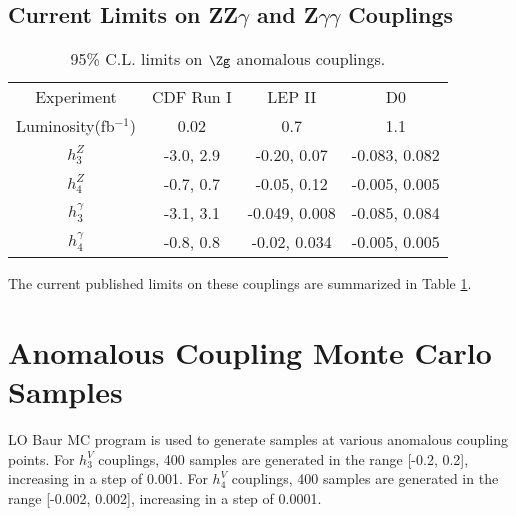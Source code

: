 \documentclass[12pt,twoside,letterpaper]{article}
\begin{document}
\subsection{Current Limits on ZZ$\gamma$ and Z$\gamma\gamma$ Couplings}
    \begin{table}[!hbtp]
    \begin{center}
    \begin{tabular}{|c|c|c|c|}
 \hline
           Experiment        &CDF Run I\cite{CDFRunIZg} &LEP II\cite{EWMsrmnt}& D0 \cite{D0Zg}     \\
      Luminosity(fb$^{-1}$)  &  0.02                    &  0.7                &   1.1                       \\
 \hline                                                                      
           $h_3^Z$           &    -3.0, 2.9             &  -0.20, 0.07        &    -0.083, 0.082                \\
           $h_4^Z$           &    -0.7, 0.7             &  -0.05, 0.12        &    -0.005, 0.005                \\
 \hline                                                                      
           $h_3^{\gamma}$    &    -3.1, 3.1             &  -0.049, 0.008      &    -0.085, 0.084                \\
           $h_4^{\gamma}$    &    -0.8, 0.8             &  -0.02, 0.034       &    -0.005, 0.005                \\
 \hline
    \end{tabular}
     \caption{95\% C.L. limits on $\Zg$ anomalous couplings. }
     \label{Table:ZgAGC}
    \end{center}
    \end{table}


The current published limits on these couplings are summarized in Table
\ref{Table:ZgAGC}. 

\section{Anomalous Coupling Monte Carlo Samples}
LO Baur MC program \cite{BaurPRD47} is used to generate \Zg samples at various
anomalous coupling points. 
For $h_3^V$ couplings, 400 samples are
generated in the range [-0.2, 0.2], increasing in a step of 0.001. 
For $h_4^V$ couplings, 400 samples are
generated in the range [-0.002, 0.002], increasing in a step of 0.0001. 
\end{document}
